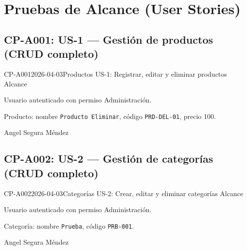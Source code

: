 \clearpage
\section{Pruebas de Alcance (User Stories)}

\subsection{CP-A001: US-1 --- Gestión de productos (CRUD completo)}
\def\cpPasos{%
  \item Crear el producto con los datos indicados.
  \item Editar el precio del producto.
  \item Eliminar el producto (sin ventas asociadas).}
\def\cpResultadoE{%
  \item CRUD completo funciona: crear, editar y eliminar.}
\def\cpResultadoO{El producto se creó, editó y eliminó correctamente. El sistema
  también previene eliminar productos con ventas asociadas (verificado en CP-I005).}
\casoprueba
  {CP-A001}{2026-04-03}{Productos}
  {US-1: Registrar, editar y eliminar productos}
  {Alcance}{\estadoAprobado}
  {\item Usuario autenticado con permiso Administración.}
  {\item Producto: nombre \texttt{Producto Eliminar}, código \texttt{PRD-DEL-01},
    precio \CRC{}100.}
  {Angel Segura Méndez}

\subsection{CP-A002: US-2 --- Gestión de categorías (CRUD completo)}
\def\cpPasos{%
  \item Crear categoría ``Prueba''.
  \item Eliminar la categoría.}
\def\cpResultadoE{%
  \item CRUD de categorías funciona correctamente.}
\def\cpResultadoO{La categoría se creó y eliminó correctamente. Al ingresar un
  código existente, el sistema actualiza en lugar de duplicar.}
\casoprueba
  {CP-A002}{2026-04-03}{Categorías}
  {US-2: Crear, editar y eliminar categorías}
  {Alcance}{\estadoAprobado}
  {\item Usuario autenticado con permiso Administración.}
  {\item Categoría: nombre \texttt{Prueba}, código \texttt{PRB-001}.}
  {Angel Segura Méndez}

